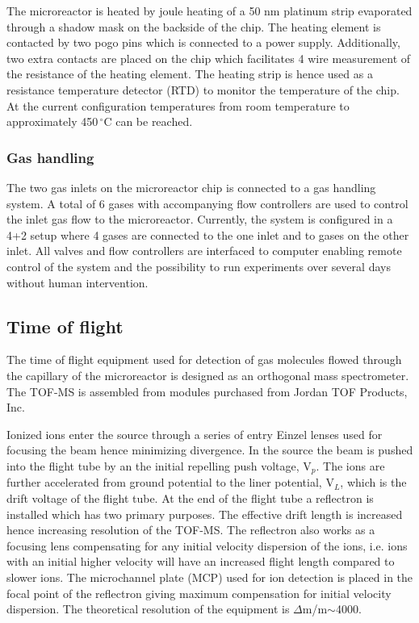 \documentclass[aip,rsi]{revtex4-1}
\begin{document}
The microreactor is heated by joule heating of a 50 nm platinum strip evaporated through a shadow mask on the backside of the chip. The heating element is contacted by two pogo pins which is connected to a power supply. Additionally, two extra contacts are placed on the chip which facilitates 4 wire measurement of the resistance of the heating element. The heating strip is hence used as a resistance temperature detector (RTD) to monitor the temperature of the chip. At the current configuration temperatures from room temperature to approximately 450\,$^{\circ}$C can be reached.


\subsubsection{Gas handling}
The two gas inlets on the microreactor chip is connected to a gas handling system. A total of 6 gases with accompanying flow controllers are used to control the inlet gas flow to the microreactor. Currently, the system is configured in a 4+2 setup where 4 gases are connected to the one inlet and to gases on the other inlet. All valves and flow controllers are interfaced to computer enabling remote control of the system and the possibility to run experiments over several days without human intervention.

\subsection{Time of flight}
The time of flight equipment used for detection of gas molecules flowed through the capillary of the microreactor is designed as an orthogonal mass spectrometer. The TOF-MS is assembled from modules purchased from Jordan TOF Products, Inc. 

Ionized ions enter the source through a series of entry Einzel lenses used for focusing the beam hence minimizing divergence. In the source the beam is pushed into the flight tube by an the initial repelling push voltage, V$_p$. The ions are further accelerated from ground potential to the liner potential, V$_L$, which is the drift voltage of the flight tube. At the end of the flight tube a reflectron is installed which has two primary purposes. The effective drift length is increased hence increasing resolution of the TOF-MS. The reflectron also works as a focusing lens compensating for any initial velocity dispersion of the ions, i.e. ions with an initial higher velocity will have an increased flight length compared to slower ions. The microchannel plate (MCP) used for ion detection is placed in the focal point of the reflectron giving maximum compensation for initial velocity dispersion. The theoretical resolution of the equipment is $\Delta$m/m$\sim$4000.
\end{document}
